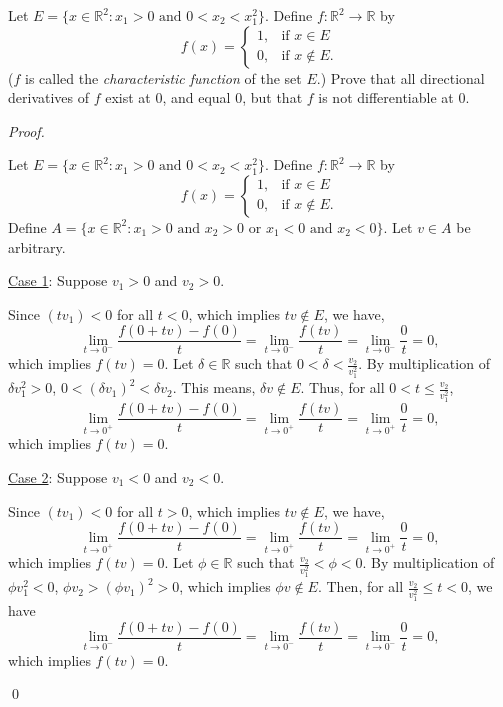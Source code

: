\documentclass[12pt]{article}
\newenvironment{problem}[2][Problem]{\begin{trivlist}
\item[\hskip \labelsep {\bfseries #1}\hskip \labelsep {\bfseries #2.}]}{\end{trivlist}}
\newenvironment{sol}
    {\emph{Proof.}
    }
    {
    \qed
    }
\begin{document}
\begin{problem}{8} 
Let $E = \{x \in \mathbb{R}^2 : x_1 > 0 \text{ and } 0 < x_2 < x_1^2\}$. Define $f : \mathbb{R}^2 \to \mathbb{R}$ by  $$f(x) = \begin{cases} 
     1, & \text{if } x \in E \\
      0, & \text{if } x \not\in E. 
   \end{cases}
$$ ($f$ is called the \textit{characteristic function} of the set $E$.) Prove that all directional derivatives of $f$ exist at 0, and equal 0, but that $f$ is not differentiable at 0.
\end{problem}
\begin{sol}
Let $E = \{x \in \mathbb{R}^2 : x_1 > 0 \text{ and } 0 < x_2 < x_1^2\}$. Define $f : \mathbb{R}^2 \to \mathbb{R}$ by  $$f(x) = \begin{cases} 
     1, & \text{if } x \in E \\
      0, & \text{if } x \not\in E. 
   \end{cases}
$$ Define $A = \{x \in \mathbb{R}^2 : x_1 > 0 \text{ and } x_2 > 0 \text{ or } x_1 < 0 \text{ and } x_2 < 0\}$. Let $v \in A$ be arbitrary. 

\vspace{1em}
\noindent\underline{Case 1}: Suppose $v_1 > 0$ and $v_2 > 0$. 

Since $(tv_1) < 0$ for all $t < 0$, which implies $tv \not\in E$, we have, $$\lim_{t \to 0^-} \frac{f(0 + tv) - f(0)}{t} = \lim_{t \to 0^-} \frac{f(tv)}{t} = \lim_{t \to 0^-} \frac{0}{t} = 0,$$ which implies $f(tv) = 0$. Let $\delta \in \mathbb{R}$ such that $0 < \delta < \frac{v_2}{v_1^2}$. By multiplication of $\delta v_1^2 > 0$, $0 < (\delta v_1)^2 < \delta v_2$. This means, $\delta v \not \in E$. Thus, for all $0 < t \leq \frac{v_2}{v_1^2}$, $$\lim_{t \to 0^+} \frac{f(0 + tv) - f(0)}{t} = \lim_{t \to 0^+} \frac{f(tv)}{t} = \lim_{t \to 0^+} \frac{0}{t} = 0,$$ which implies $f(tv) = 0$.

\vspace{1em}
\noindent\underline{Case 2}: Suppose $v_1 < 0$ and $v_2 < 0$. 

Since $(tv_1) < 0$ for all $t > 0$, which implies $tv \not\in E$, we have, $$\lim_{t \to 0^+} \frac{f(0 + tv) - f(0)}{t} = \lim_{t \to 0^+} \frac{f(tv)}{t} = \lim_{t \to 0^+} \frac{0}{t} = 0,$$ which implies $f(tv) = 0$. Let $\phi \in \mathbb{R}$ such that $\frac{v_2}{v_1^2} < \phi < 0$. By multiplication of $\phi v_1^2 < 0$, $\phi v_2 > (\phi v_1)^2 > 0$, which implies $\phi v \not\in E$. Then, for all $\frac{v_2}{v_1^2} \leq t < 0$, we have $$\lim_{t \to 0^-} \frac{f(0 + tv) - f(0)}{t} = \lim_{t \to 0^-} \frac{f(tv)}{t} = \lim_{t \to 0^-} \frac{0}{t} = 0,$$ which implies $f(tv) = 0$.


\end{sol}
\end{document}
